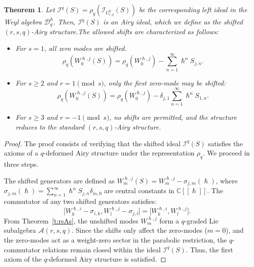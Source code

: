 \documentclass[reqno,11pt]{amsart}
\theoremstyle{plain}
\newtheorem{theorem}{Theorem}[section]
\theoremstyle{definition}
\theoremstyle{remark}
\numberwithin{equation}{section}
\newcommand{\1}{\mathds{1}}
\newcommand{\2}{\frac{1}{2}}
\begin{document}
{\begin{theorem}
					Let 
					$\mathcal{I}^q(S)=\rho_q(\mathcal{I}_{U_{r,q}^\hslash}(S))$ be the corresponding left ideal in the Weyl algebra $\mathcal{D}_{q}^\hslash$. Then, $\mathcal{I}^q(S)$ is an Airy ideal, which we define as the shifted $(r,s,q)$-Airy structure.The allowed shifts are characterized as follows:
					\begin{itemize}
						\item
						For $s=1$, all zero modes are shifted.
						\begin{equation}
							\rho_q(W^{\hslash,j}_0(S)) = \rho_q(W^{\hslash,j}_0) - \sum_{n=1}^\infty \hslash^n S_{j,n}.
						\end{equation}
						\item For $s \geq 2$ and $r = 1 \pmod{s}$, only the first zero-mode may be shifted:
						\begin{equation}
							\rho_q(W^{\hslash,j}_0(S)) = \rho_q(W^{\hslash,j}_0) - \delta_{j,1} \sum_{n=1}^\infty \hslash^n S_{1,n}.
						\end{equation}
						\item For $s \geq 3$ and $r = -1 \pmod{s}$, no shifts are permitted, and the structure reduces to the standard $(r,s,q)$-Airy structure.
					\end{itemize}
				\end{theorem}
				\begin{proof}
					{The proof consists of verifying that the shifted ideal $\mathcal{I}^q(S)$ satisfies the axioms of a $q$-deformed Airy structure under the representation $\rho_q$. We proceed in three steps.}
					
					{The shifted generators are defined as $W^{\hslash,j}_m(S) = W^{\hslash,j}_m - \sigma_{j,m}(\hslash)$, where $\sigma_{j,m}(\hslash) = \sum_{n=1}^\infty \hslash^n S_{j,n} \delta_{m,0}$ are central constants in $\mathbb{C}[[\hslash]]$. 
						The commutator of any two shifted generators satisfies:
						\begin{equation}
							\big[W^{\hslash,i}_k - \sigma_{i,k}, W^{\hslash,j}_l - \sigma_{j,l}\big] = \big[W^{\hslash,i}_k, W^{\hslash,j}_l\big].
						\end{equation}
						From Theorem~\ref{t:rsAs}, the unshifted modes $W^{\hslash,j}_m$ form a $q$-graded Lie subalgebra $\mathcal{A}(r,s,q)$. Since the shifts only affect the zero-modes ($m=0$), and the zero-modes act as a weight-zero sector in the parabolic restriction, the $q$-commutator relations remain closed within the ideal $\mathcal{I}^q(S)$. Thus, the first axiom of the $q$-deformed Airy structure is satisfied.}
					

\end{proof}}
\end{document}

